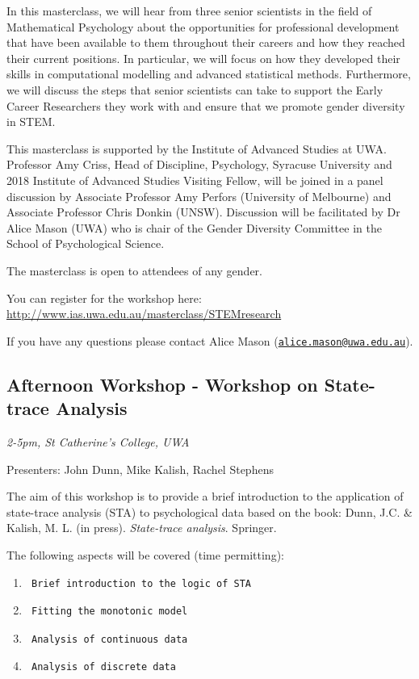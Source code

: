 \documentclass[]{article}
\begin{document}
In this masterclass, we will hear from three senior scientists in the
field of Mathematical Psychology about the opportunities for
professional development that have been available to them throughout
their careers and how they reached their current positions. In
particular, we will focus on how they developed their skills in
computational modelling and advanced statistical methods. Furthermore,
we will discuss the steps that senior scientists can take to support the
Early Career Researchers they work with and ensure that we promote
gender diversity in STEM.

This masterclass is supported by the Institute of Advanced Studies at
UWA. Professor Amy Criss, Head of Discipline, Psychology, Syracuse
University and 2018 Institute of Advanced Studies Visiting Fellow, will
be joined in a panel discussion by Associate Professor Amy Perfors
(University of Melbourne) and Associate Professor Chris Donkin (UNSW).
Discussion will be facilitated by Dr Alice Mason (UWA) who is chair of
the Gender Diversity Committee in the School of Psychological Science.

The masterclass is open to attendees of any gender.

You can register for the workshop here:
\url{http://www.ias.uwa.edu.au/masterclass/STEMresearch}

If you have any questions please contact Alice Mason
(\href{mailto:alice.mason@uwa.edu.au}{\nolinkurl{alice.mason@uwa.edu.au}}).

\subsection{Afternoon Workshop - Workshop on State-trace
Analysis}\label{afternoon-workshop---workshop-on-state-trace-analysis}

\emph{2-5pm, St Catherine's College, UWA }

Presenters: John Dunn, Mike Kalish, Rachel Stephens

The aim of this workshop is to provide a brief introduction to the
application of state-trace analysis (STA) to psychological data based on
the book: Dunn, J.C. \& Kalish, M. L. (in press). \emph{State-trace
analysis}. Springer.

The following aspects will be covered (time permitting):

\begin{enumerate}
\def\labelenumi{\arabic{enumi}.}
\item
\begin{verbatim}
 Brief introduction to the logic of STA
\end{verbatim}
\item
\begin{verbatim}
 Fitting the monotonic model
\end{verbatim}
\item
\begin{verbatim}
 Analysis of continuous data
\end{verbatim}
\item
\begin{verbatim}
 Analysis of discrete data
\end{verbatim}
\end{enumerate}
\end{document}
